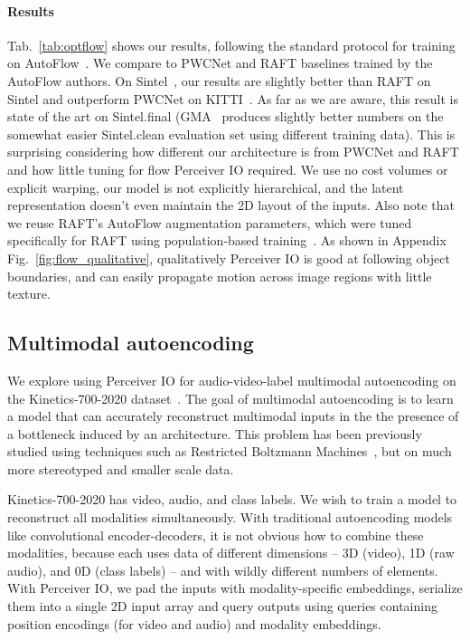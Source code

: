 \documentclass{article} %
\newcommand{\ourmodel}{Perceiver IO\xspace}
\begin{document}
\paragraph{Results} Tab.~\ref{tab:optflow} shows our results, following the standard protocol for training on AutoFlow~\citep{sun2021autoflow}. We compare to PWCNet and RAFT baselines trained by the AutoFlow authors.  On Sintel~\citep{butler2012naturalistic}, our results are slightly better than RAFT on Sintel and outperform PWCNet on KITTI~\citep{menze2015object}.  As far as we are aware, this result is state of the art on Sintel.final (GMA~\cite{jiang2021learning} produces slightly better numbers on the somewhat easier Sintel.clean evaluation set using different training data). This is surprising considering how different our architecture is from PWCNet and RAFT and how little tuning for flow \ourmodel{} required.  We use no cost volumes or explicit warping, our model is not explicitly hierarchical, and the latent representation doesn't even maintain the 2D layout of the inputs.  Also note that we reuse RAFT's AutoFlow augmentation parameters, which were tuned specifically for RAFT using population-based training~\citep{sun2021autoflow}.  As shown in Appendix Fig.~\ref{fig:flow_qualitative}, qualitatively \ourmodel{} is good at following object boundaries, and can easily propagate motion across image regions with little texture.  

\subsection{Multimodal autoencoding}
\label{sec:multimodal}
We explore using \ourmodel{} for audio-video-label multimodal autoencoding on the Kinetics-700-2020 dataset~\citep{smaira2020short}. The goal of multimodal autoencoding is to learn a model that can accurately reconstruct multimodal inputs in the the presence of a bottleneck induced by an architecture. This problem has been previously studied using techniques such as Restricted Boltzmann Machines~\citep{ngiam2011multimodal}, but on much more stereotyped and smaller scale data.

Kinetics-700-2020 has video, audio, and class labels. We wish to train a model to reconstruct all modalities simultaneously. With traditional autoencoding models like convolutional encoder-decoders, it is not obvious how to combine these modalities, because each uses data of different dimensions -- 3D (video), 1D (raw audio), and 0D (class labels) -- and with wildly different numbers of elements. With \ourmodel{}, we pad the inputs with modality-specific embeddings, serialize them into a single 2D input array and query outputs using queries containing position encodings (for video and audio) and modality embeddings.
\end{document}
